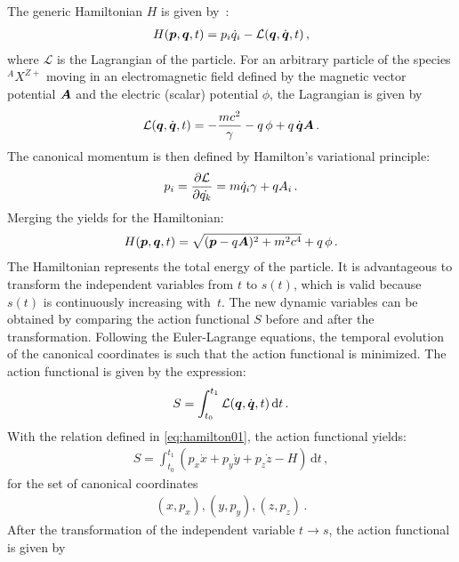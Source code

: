 The generic Hamiltonian $H$ is given by~\cite{berz:beam_physics}:
%
\begin{align}
  H(\boldsymbol{p},\boldsymbol{q},t) = p_i \dot{q}_i - \mathcal{L}(\boldsymbol{q},\dot{\boldsymbol{q}},t) \, , \label{eq:hamilton01}
\end{align}
%
where $\mathcal{L}$ is the Lagrangian of the particle. For an arbitrary particle of the species $^AX^{Z+}$ moving in an electromagnetic field defined by the magnetic vector potential $\boldsymbol{A}$ and the electric (scalar) potential $\phi$, the Lagrangian is given by
%
\begin{align}
  \mathcal{L}(\boldsymbol{q},\dot{\boldsymbol{q}},t) = - \frac{m c^2}{\gamma} - q \, \phi + q \, \dot{\boldsymbol{q}} \boldsymbol{A} \, . \label{eq:lagrangian01}
\end{align}
%
The canonical momentum is then defined by Hamilton's variational principle:
%
\begin{align}
  p_i = \frac{\partial\mathcal{L}}{\partial\dot{q_k}} = m \dot{q}_i \gamma + q  A_i \, .
\end{align}
%
Merging the  yields for the Hamiltonian:
%
\begin{align}
  H(\boldsymbol{p},\boldsymbol{q},t) = \sqrt{(\boldsymbol{p}- q \boldsymbol{A})^2 + m^2c^4} + q \, \phi \, . \label{eq:h02}
\end{align}
%
The Hamiltonian represents the total energy of the particle. It is advantageous to transform the independent variables from $t$ to $s(t)$, which is valid because $s(t)$ is continuously increasing \mbox{with $t$}. The new dynamic variables can be obtained by comparing the action functional $S$ before and after the transformation. Following the Euler-Lagrange equations, the temporal evolution of the canonical coordinates is such that the action functional is minimized. The action functional is given by the expression:
%
\begin{align}
  S= \int_{t_0}^{t_1} \mathcal{L}(\boldsymbol{q},\dot{\boldsymbol{q}}, t)\,  \mathrm{d}t \, .
\end{align}
%
With the relation defined in \eqref{eq:hamilton01}, the action functional yields:
%
\begin{align}
  S = \int_{t_0}^{t_1} (p_x \dot{x} + p_y \dot{y} + p_z \dot{z} - H) \, \mathrm{d} t \, ,
\end{align}
for the set of canonical coordinates 
%
\begin{align}
  (x,p_x), (y,p_y), (z,p_z) \, .
\end{align}
%
%
After the transformation of the independent variable $t \rightarrow s$, the action functional is given by
